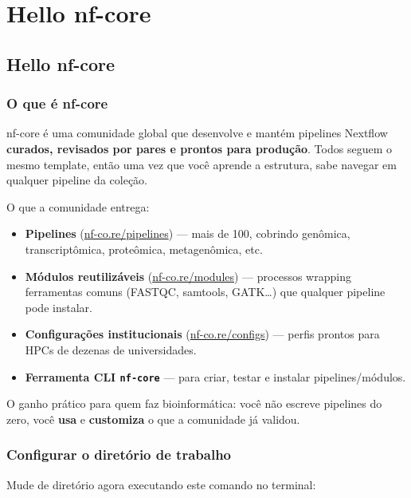 \documentclass[
  brazilian,
  letterpaper,
  DIV=11,
  numbers=noendperiod]{scrreprt}
\providecommand{\tightlist}{%
  \setlength{\itemsep}{0pt}\setlength{\parskip}{0pt}}
\begin{document}
\part{Hello nf-core}

\chapter{Hello nf-core}\label{hello-nf-core-1}

\section{O que é nf-core}\label{o-que-uxe9-nf-core}

nf-core é uma comunidade global que desenvolve e mantém pipelines
Nextflow \textbf{curados, revisados por pares e prontos para produção}.
Todos seguem o mesmo template, então uma vez que você aprende a
estrutura, sabe navegar em qualquer pipeline da coleção.

O que a comunidade entrega:

\begin{itemize}
\tightlist
\item
  \textbf{Pipelines}
  (\href{https://nf-co.re/pipelines}{nf-co.re/pipelines}) --- mais de
  100, cobrindo genômica, transcriptômica, proteômica, metagenômica,
  etc.
\item
  \textbf{Módulos reutilizáveis}
  (\href{https://nf-co.re/modules}{nf-co.re/modules}) --- processos
  wrapping ferramentas comuns (FASTQC, samtools, GATK\ldots) que
  qualquer pipeline pode instalar.
\item
  \textbf{Configurações institucionais}
  (\href{https://nf-co.re/configs}{nf-co.re/configs}) --- perfis prontos
  para HPCs de dezenas de universidades.
\item
  \textbf{Ferramenta CLI \texttt{nf-core}} --- para criar, testar e
  instalar pipelines/módulos.
\end{itemize}

O ganho prático para quem faz bioinformática: você não escreve pipelines
do zero, você \textbf{usa} e \textbf{customiza} o que a comunidade já
validou.

\section{Configurar o diretório de
trabalho}\label{configurar-o-diretuxf3rio-de-trabalho}

Mude de diretório agora executando este comando no terminal:
\end{document}
